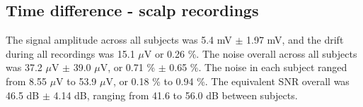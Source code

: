 \subsection{Time difference - scalp recordings}
The signal amplitude across all subjects was 5.4 mV $\pm$ 1.97 mV, and the drift during all recordings was 15.1 $\mu$V or 0.26 \%. The noise overall across all subjects was 37.2 $\mu$V $\pm$ 39.0 $\mu$V, or 0.71 \% $\pm$ 0.65 \%. The noise in each subject ranged from 8.55 $\mu$V to 53.9 $\mu$V, or 0.18 \% to 0.94 \%. The equivalent SNR overall was 46.5 dB $\pm$ 4.14 dB, ranging from 41.6 to 56.0 dB between subjects. 
 
